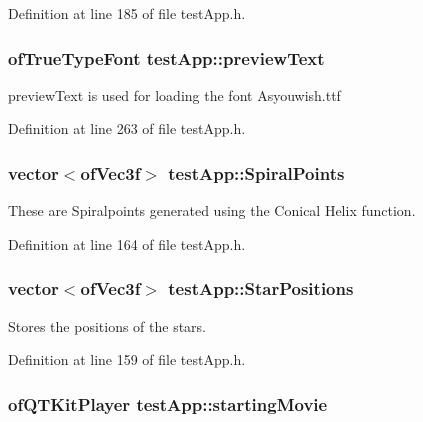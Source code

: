Definition at line 185 of file test\-App.\-h.

\hypertarget{classtest_app_af5b1af55af2256ef3751de075fc7a9cc}{
\subsubsection[{preview\-Text}]{\setlength{\rightskip}{0pt plus 5cm}of\-True\-Type\-Font test\-App\-::preview\-Text}}\label{classtest_app_af5b1af55af2256ef3751de075fc7a9cc}


preview\-Text is used for loading the font Asyouwish.\-ttf 



Definition at line 263 of file test\-App.\-h.

\hypertarget{classtest_app_af0dd2f3e3aabdb43bee49d74c156dc05}{
\subsubsection[{Spiral\-Points}]{\setlength{\rightskip}{0pt plus 5cm}vector$<$of\-Vec3f$>$ test\-App\-::\-Spiral\-Points}}\label{classtest_app_af0dd2f3e3aabdb43bee49d74c156dc05}


These are Spiralpoints generated using the Conical Helix function. 



Definition at line 164 of file test\-App.\-h.

\hypertarget{classtest_app_a68d0d30cea64a9d39a1b2deef16677ad}{
\subsubsection[{Star\-Positions}]{\setlength{\rightskip}{0pt plus 5cm}vector$<$of\-Vec3f$>$ test\-App\-::\-Star\-Positions}}\label{classtest_app_a68d0d30cea64a9d39a1b2deef16677ad}


Stores the positions of the stars. 



Definition at line 159 of file test\-App.\-h.

\hypertarget{classtest_app_a9bfe7793fa0689a991ff64174745c38f}{
\subsubsection[{starting\-Movie}]{\setlength{\rightskip}{0pt plus 5cm}of\-Q\-T\-Kit\-Player test\-App\-::starting\-Movie}}\label{classtest_app_a9bfe7793fa0689a991ff64174745c38f}


